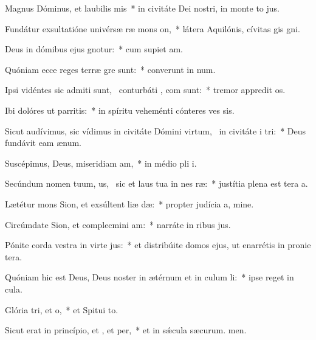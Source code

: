 \item Magnus Dóminus, et laubilis mis~* in civitáte Dei nostri, in monte to jus.
\item Fundátur exsultatióne univérsæ ræ mons on,~* látera Aquilónis, cívitas gis gni.
\item Deus in dómibus ejus gnotur:~* cum supiet am.
\item Quóniam ecce reges terræ gre sunt:~* converunt in num.
\item Ipsi vidéntes sic admiti sunt,~\pscross{} conturbáti , com sunt:~* tremor appredit os.
\item Ibi dolóres ut parritis:~* in spíritu veheménti cónteres ves sis.
\item Sicut audívimus, sic vídimus in civitáte Dómini virtum,~\pscross{} in civitáte i tri:~* Deus fundávit eam  ænum.
\item Suscépimus, Deus, miseridiam am,~* in médio pli i.
\item Secúndum nomen tuum, us,~\pscross{} sic et laus tua in nes ræ:~* justítia plena est tera a.
\item Lætétur mons Sion, et exsúltent liæ dæ:~* propter judícia a, mine.
\item Circúmdate Sion, et complecmini am:~* narráte in ribus jus.
\item Pónite corda vestra in virte jus:~* et distribúite domos ejus, ut enarrétis in pronie tera.
\item Quóniam hic est Deus, Deus noster in ætérnum et in culum li:~* ipse reget  in cula.
\item Glória tri, et o,~* et Spitui to.
\item Sicut erat in princípio, et , et per,~* et in sǽcula sæcurum. men.
